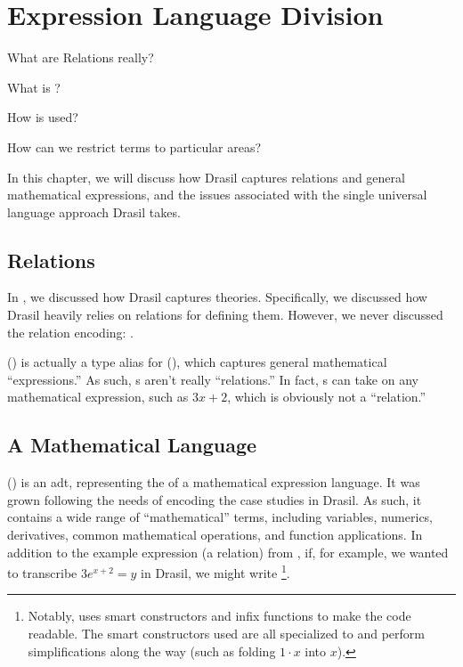 \chapter{Expression Language Division}
\label{chap:lang-division}

\begin{writingdirectives}
    \item What are Relations really?
    \item What is \Expr{}?
    \item How is \Expr{} used?
    \item How can we restrict \Expr{} terms to particular areas?
\end{writingdirectives}

In this chapter, we will discuss how Drasil captures relations and general
mathematical expressions, and the issues associated with the single universal
language approach Drasil takes.

\section{Relations}
\label{chap:lang-division:sec:relations}

In , we discussed how Drasil captures theories.
Specifically, we discussed how Drasil heavily relies on relations for defining
them. However, we never discussed the relation encoding: \Relation{}.

\originalRelation{}

\Relation{} () is actually a type alias for \Expr{}
(), which captures general mathematical
``expressions.'' As such, \Relation{}s aren't really ``relations.'' In fact,
\Relation{}s can take on any mathematical expression, such as \(3x+2\), which is
obviously not a ``relation.''

\originalExprHaskell{}

\section{A Mathematical Language}
\label{chap:lang-division:sec:a-mathematical-language}

\Expr{} () is an \acs{adt}, representing the 
of a mathematical expression language. It was grown following the needs of
encoding the case studies in Drasil. As such, it contains a wide range of
``mathematical'' terms, including variables, numerics, derivatives, common
mathematical operations, and function applications. In addition to the example
expression (a relation) from , if, for
example, we wanted to transcribe \(3 e^{x + 2} = y\) in Drasil, we might write
\footnote{Notably, 
uses smart constructors and infix functions to make the code readable. The smart
constructors used are all specialized to \Expr{} and perform simplifications
along the way (such as folding \(1 \cdot x\) into \(x\)).}. 

